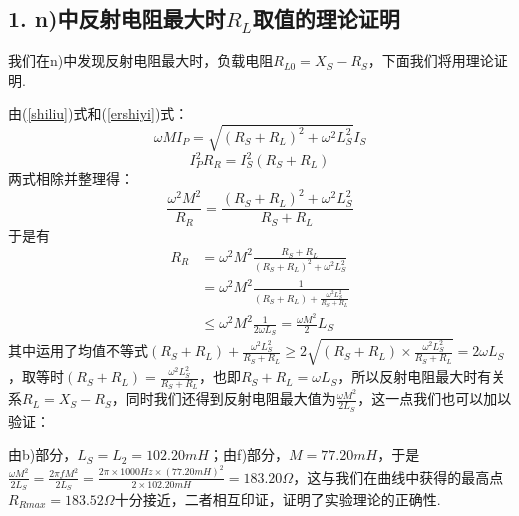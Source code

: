 \documentclass[UTF8]{ctexart}
\begin{document}
\subsection*{1. n)中反射电阻最大时$R_L$取值的理论证明}
我们在n)中发现反射电阻最大时，负载电阻$R_{L0}=X_S-R_S$，下面我们将用理论证明.\par
由(\ref{shiliu})式和(\ref{ershiyi})式：
\[\omega M I_P=\sqrt{(R_S+R_L)^2+\omega^2L_S^2}I_S\]
\[I_P^2R_R=I_S^2(R_S+R_L)\]
两式相除并整理得：
\begin{equation}
    \frac{\omega^2M^2}{R_R}=\frac{(R_S+R_L)^2+\omega^2L_S^2}{R_S+R_L}
\end{equation}
于是有
\begin{equation}
    \begin{aligned}
    R_R&=\omega^2M^2\frac{R_S+R_L}{(R_S+R_L)^2+\omega^2L_S^2}\\
    &=\omega^2M^2\frac{1}{(R_S+R_L)+\frac{\omega^2L_S^2}{R_S+R_L}}\\
    &\leq \omega^2M^2\frac{1}{2\omega L_S}=\frac{\omega M^2}2{L_S}
    \end{aligned}
\end{equation}
其中运用了均值不等式$\displaystyle{(R_S+R_L)+\frac{\omega^2L_S^2}{R_S+R_L}\geq 2\sqrt{(R_S+R_L)\times\frac{\omega^2L_S^2}{R_S+R_L}}=2\omega L_S}$，取等时$\displaystyle{(R_S+R_L)=\frac{\omega^2L_S^2}{R_S+R_L}}$，也即$R_S+R_L=\omega L_S$，所以反射电阻最大时有关系$R_{L}=X_S-R_S$，同时我们还得到反射电阻最大值为$\displaystyle{\frac{\omega M^2}{2L_S}}$，这一点我们也可以加以验证：\par
由b)部分，$L_S=L_2=102.20mH$；由f)部分，$M=77.20mH$，于是$\displaystyle{\frac{\omega M^2}{2L_S}=\frac{2\pi f M^2}{2L_S}}=\frac{2\pi\times 1000Hz \times(77.20mH)^2}{2\times 102.20mH}=183.20\Omega$，这与我们在曲线中获得的最高点$R_{Rmax}=183.52\Omega$十分接近，二者相互印证，证明了实验理论的正确性.
\end{document}
